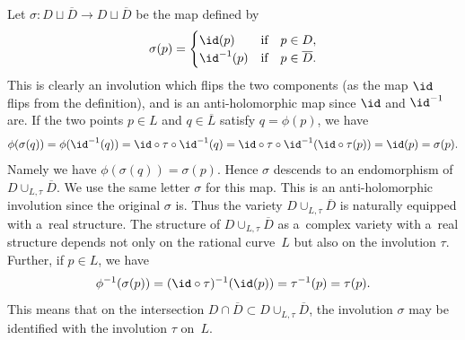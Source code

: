 Let $\sigma:D\sqcup \overline D\to D\sqcup \overline D$ be the map def\/ined by
\begin{gather*}
\sigma (p) =
\begin{cases}
\id (p) &\text{if}\quad p\in D,
\\
\id^{-1}(p) &\text{if}\quad p\in \overline D.
\end{cases}
\end{gather*}
This is clearly an involution which f\/lips the two components (as the map $\id$ f\/lips from the def\/inition),
and is an anti-holomorphic map since $\id$ and $\id^{-1}$ are.
If the two points $p\in L$ and $q\in \overline L$ satisfy $q = \phi(p)$, we have
\begin{gather*}
\phi(\sigma(q)) = \phi(\id^{-1}(q))=\id\circ\tau\circ\id^{-1}(q)=\id\circ\tau\circ\id^{-1} (\id\circ\tau(p)) = \id(p)=\sigma(p).
\end{gather*}
Namely we have $\phi(\sigma(q)) = \sigma(p)$.
Hence $\sigma$ descends to an endomorphism of $D\cup_{L,\tau}\overline D$.
We use the same letter $\sigma$ for this map.
This is an anti-holomorphic involution since the original $\sigma$ is.
Thus the variety $D\cup_{L,\tau}\overline D$ is naturally equipped with a~real structure.
The structure of $D\cup_{L,\tau}\overline D$ as a~complex variety with a~real structure depends not only on the
rational curve~$L$ but also on the involution $\tau$.
Further, if $p\in L$, we have
\begin{gather*}
\phi^{-1}(\sigma(p)) = (\id\circ\tau)^{-1}(\id (p)) = \tau^{-1}(p) = \tau (p).
\end{gather*}
This means that on the intersection $D\cap \overline D\subset D\cup_{L,\tau}\overline D$, the involution $\sigma$ may be
identif\/ied with the involution $\tau$ on~$L$.

